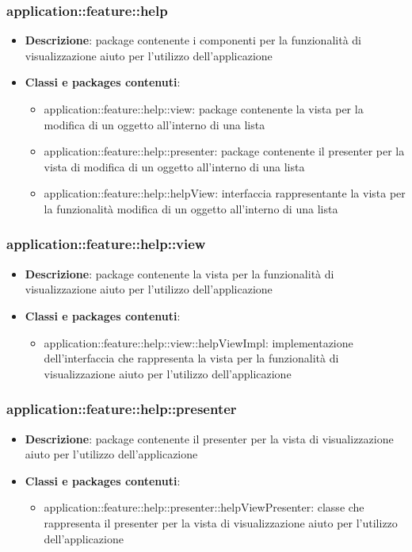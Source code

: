 \subsubsection{application::feature::help}
\begin{itemize}
	\item \textbf{Descrizione}: package contenente i componenti per la funzionalità di visualizzazione aiuto per l'utilizzo dell'applicazione
	\item \textbf{Classi e packages contenuti}:
	\begin{itemize}
	\item application::feature::help::view: package contenente la vista per la modifica di un oggetto all'interno di una lista
	\item application::feature::help::presenter: package contenente il presenter per la vista di modifica di un oggetto all'interno di una lista
	\item application::feature::help::helpView: interfaccia rappresentante la vista per la funzionalità modifica di un oggetto all'interno di una lista
	\end{itemize}
\end{itemize}

\subsubsection{application::feature::help::view}
\begin{itemize}
	\item \textbf{Descrizione}: package contenente la vista per la funzionalità di visualizzazione aiuto per l'utilizzo dell'applicazione
	\item \textbf{Classi e packages contenuti}:
	\begin{itemize}
	\item application::feature::help::view::helpViewImpl: implementazione dell'interfaccia che rappresenta la vista per la funzionalità di visualizzazione aiuto per l'utilizzo dell'applicazione
	\end{itemize}
\end{itemize}

\subsubsection{application::feature::help::presenter}
\begin{itemize}
	\item \textbf{Descrizione}: package contenente il presenter per la vista di visualizzazione aiuto per l'utilizzo dell'applicazione
	\item \textbf{Classi e packages contenuti}:
	\begin{itemize}
	\item application::feature::help::presenter::helpViewPresenter: classe che rappresenta il presenter per la vista di visualizzazione aiuto per l'utilizzo dell'applicazione
	\end{itemize}
\end{itemize}

